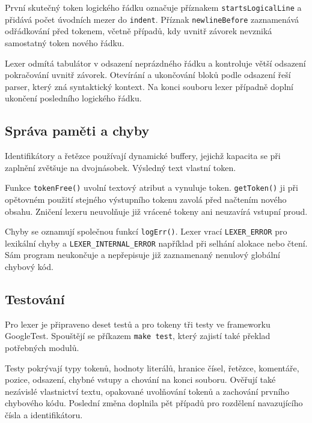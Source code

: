 \documentclass{article}
\begin{document}
První skutečný token logického řádku označuje příznakem \texttt{startsLogicalLine} a přidává počet úvodních mezer do \texttt{indent}. Příznak \texttt{newlineBefore} zaznamenává odřádkování před tokenem, včetně případů, kdy uvnitř závorek nevzniká samostatný token nového řádku.

Lexer odmítá tabulátor v odsazení neprázdného řádku a kontroluje větší odsazení pokračování uvnitř závorek. Otevírání a ukončování bloků podle odsazení řeší parser, který zná syntaktický kontext. Na konci souboru lexer případně doplní ukončení posledního logického řádku.

\subsection{Správa paměti a chyby}

Identifikátory a řetězce používají dynamické buffery, jejichž kapacita se při zaplnění zvětšuje na dvojnásobek. Výsledný text vlastní token.

Funkce \texttt{tokenFree()} uvolní textový atribut a vynuluje token. \texttt{getToken()} ji při opětovném použití stejného výstupního tokenu zavolá před načtením nového obsahu. Zničení lexeru neuvolňuje již vrácené tokeny ani neuzavírá vstupní proud.

Chyby se oznamují společnou funkcí \texttt{logErr()}. Lexer vrací \texttt{LEXER\_ERROR} pro lexikální chyby a \texttt{LEXER\_INTERNAL\_ERROR} například při selhání alokace nebo čtení. Sám program neukončuje a nepřepisuje již zaznamenaný nenulový globální chybový kód.

\subsection{Testování}

Pro lexer je připraveno deset testů a pro tokeny tři testy ve frameworku GoogleTest. Spouštějí se příkazem \texttt{make test}, který zajistí také překlad potřebných modulů.

Testy pokrývají typy tokenů, hodnoty literálů, hranice čísel, řetězce, komentáře, pozice, odsazení, chybné vstupy a chování na konci souboru. Ověřují také nezávislé vlastnictví textu, opakované uvolňování tokenů a zachování prvního chybového kódu. Poslední změna doplnila pět případů pro rozdělení navazujícího čísla a identifikátoru.

\newpage
\end{document}
